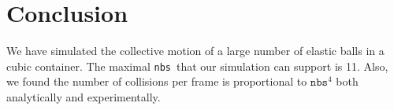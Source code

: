 \documentclass[twoside,11pt]{article}
\newcommand{\nbs}{\texttt{nbs}}
\begin{document}
\section{Conclusion}
We have simulated the collective motion of a large number of 
elastic balls in a
cubic container. The maximal \nbs\ that our simulation
can support is 11. Also, we found the
number of collisions per frame is proportional to $\nbs^4$ both
analytically and experimentally. 

%
%
%
%
%
\end{document}
